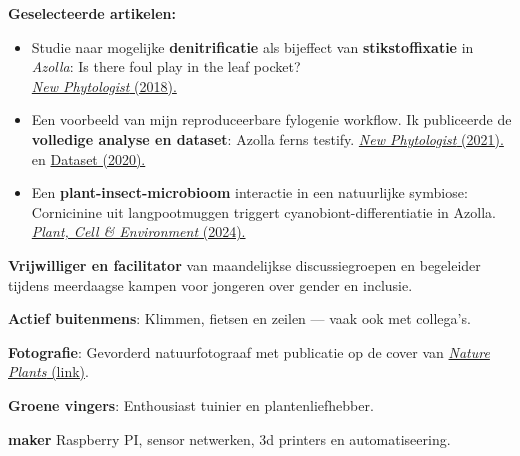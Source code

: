 \documentclass[a4paper,10pt]{article}
\begin{document}
\noindent \textbf{Geselecteerde artikelen:}
\begin{itemize}
  \setlength{\itemsep}{0em}

  \item Studie naar mogelijke \textbf{denitrificatie} als bijeffect van \textbf{stikstoffixatie} in \emph{Azolla}: 
    Is there foul play in the leaf pocket? \\
    {\null\hfill\footnotesize\href{https://doi.org/10.1111/nph.14843}{\emph{New Phytologist} (2018).}}

  \item Een voorbeeld van mijn reproduceerbare fylogenie workflow. Ik publiceerde de \textbf{volledige analyse en dataset}: Azolla ferns testify. 
    {\null\hfill\footnotesize \href{https://doi.org/10.1111/nph.16896}{\emph{New Phytologist} (2021).}  en
    \href{https://doi.org/10.5281/zenodo.3959057}{Dataset (2020).}}

  \item Een \textbf{plant-insect-microbioom} interactie in een natuurlijke symbiose: Cornicinine uit langpootmuggen triggert cyanobiont-differentiatie in Azolla.
    {\null\hfill\footnotesize\href{https://doi.org/10.1111/pce.14907}{\emph{Plant, Cell \& Environment} (2024).} }
\end{itemize}

\vfill

\begin{description}
  \raggedright
  \item \textbf{Vrijwilliger en facilitator} van maandelijkse discussiegroepen en begeleider tijdens meerdaagse kampen voor jongeren over gender en inclusie.
  \item \textbf{Actief buitenmens}: Klimmen, fietsen en zeilen — vaak ook met collega’s.
  \item \textbf{Fotografie}: Gevorderd natuurfotograaf met publicatie op de cover van \href{https://lauralwd.github.io/photography/}{\emph{Nature Plants} (link)}.
  \item \textbf{Groene vingers}: Enthousiast tuinier en plantenliefhebber.
  \item \textbf{maker} Raspberry PI, sensor netwerken, 3d printers en automatiseering.
\end{description}
\end{document}
